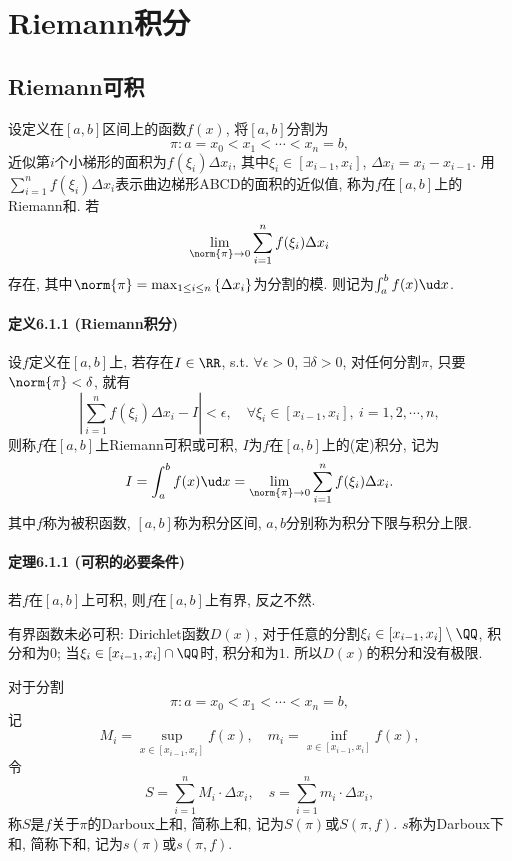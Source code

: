 \section{Riemann积分}

\subsection{Riemann可积}

设定义在$[a,b]$区间上的函数$f(x)$, 将$[a,b]$分割为
\[
\pi:a=x_{0}<x_{1}<\cdots<x_{n}=b,
\]
近似第$i$个小梯形的面积为$f(\xi_{i})\Delta x_{i}$, 其中$\xi_{i}\in[x_{i-1},x_{i}]$,
$\Delta x_{i}=x_{i}-x_{i-1}$. 用$\sum_{i=1}^{n}f(\xi_{i})\Delta x_{i}$表示曲边梯形ABCD的面积的近似值,
称为$f$在$[a,b]$上的Riemann和. 若
\[
\lim_{\norm{\pi}\to0}\sum_{i=1}^{n}f(\xi_{i})\Delta x_{i}
\]
存在, 其中$\norm{\pi}=\max_{1\le i\le n}\left\{ \Delta x_{i}\right\} $为分割的模.
则记为$\int_{a}^{b}f(x)\ud x$.

\paragraph{定义6.1.1 (Riemann积分)}

设$f$定义在$[a,b]$上, 若存在$I\in\RR$, s.t. $\forall\epsilon>0$, $\exists\delta>0$,
对任何分割$\pi$, 只要$\norm{\pi}<\delta$, 就有
\[
\left|\sum_{i=1}^{n}f(\xi_{i})\Delta x_{i}-I\right|<\epsilon,\quad\forall\xi_{i}\in[x_{i-1},x_{i}],\ i=1,2,\cdots,n,
\]
则称$f$在$[a,b]$上Riemann可积或可积, $I$为$f$在$[a,b]$上的(定)积分, 记为
\[
I=\int_{a}^{b}f(x)\ud x=\lim_{\norm{\pi}\to0}\sum_{i=1}^{n}f(\xi_{i})\Delta x_{i}.
\]
其中$f$称为被积函数, $[a,b]$称为积分区间, $a,b$分别称为积分下限与积分上限.

\paragraph{定理6.1.1 (可积的必要条件)}

若$f$在$[a,b]$上可积, 则$f$在$[a,b]$上有界, 反之不然.

有界函数未必可积: Dirichlet函数$D(x)$, 对于任意的分割$\xi_{i}\in[x_{i-1},x_{i}]\setminus\QQ$,
积分和为$0$; 当$\xi_{i}\in[x_{i-1},x_{i}]\cap\QQ$时, 积分和为$1$. 所以$D(x)$的积分和没有极限.

对于分割
\[
\pi:a=x_{0}<x_{1}<\cdots<x_{n}=b,
\]
记
\[
M_{i}=\sup_{x\in[x_{i-1},x_{i}]}f(x),\quad m_{i}=\inf_{x\in[x_{i-1},x_{i}]}f(x),
\]
令
\[
S=\sum_{i=1}^{n}M_{i}\cdot\Delta x_{i},\quad s=\sum_{i=1}^{n}m_{i}\cdot\Delta x_{i},
\]
称$S$是$f$关于$\pi$的Darboux上和, 简称上和, 记为$S(\pi)$或$S(\pi,f)$. $s$称为Darboux下和,
简称下和, 记为$s(\pi)$或$s(\pi,f)$. 

